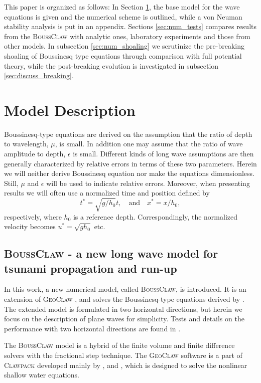 \documentclass[review]{elsarticle}
\newcommand{\BoussClaw}{\textsc{BoussClaw} }
\newcommand{\BoussClawt}{\textsc{BoussClaw}}
\begin{document}
This paper is organized as follows: In Section \ref{sec:model}, the base model
for the wave equations is given and the numerical scheme is outlined,
while a von Neuman stability analysis is put in an appendix. 
Sections \ref{sec:num_tests} compares results from the \BoussClaw with analytic ones, laboratory experiments and those from other models. 
In subsection \ref{sec:num_shoaling} we scrutinize the pre-breaking shoaling of Boussinesq type equations through comparison with full potential theory, while the post-breaking evolution is investigated in  subsection  \ref{sec:discuss_breaking}.

\section{Model Description}
\label{sec:model}

Boussinesq-type equations are   derived 
on the assumption that the ratio of depth to wavelength, $\mu$,
is small. In addition one may assume that 
the ratio of wave amplitude to depth, $\epsilon$ is small.
Different kinds of long wave assumptions are then generally characterized
by relative errors in terms of these two parameters.
Herein we will neither derive Boussinesq equation nor make the equations 
dimensionless. Still, $\mu$ and $\epsilon$ will be used to indicate relative errors.
Moreover, when presenting results we will often use a normalized time and position defined by 
\begin{equation}
\label{eq:norm_coord}
t^*=\sqrt{g/h_0}t,\quad \mathrm{and}\quad x^*=x/h_0,
\end{equation}
 respectively, where $h_0$ is a reference depth. Correspondingly, the 
normalized velocity becomes $u^*=\sqrt{gh_0}$ etc.

\subsection{\BoussClaw - a new long wave model for tsunami propagation and run-up}
In this work, a new numerical model, 
called \BoussClawt, is introduced. 
It is an extension of \textsc{GeoClaw} \citep{clawpack},
and solves 
the Boussinesq-type equations derived by \citet{schaffer1995further}.
The extended model is formulated in two horizontal directions, 
but herein we focus on the description of plane waves for simplicity. 
Tests and details on the 
performance with two horizontal directions are found in \cite{kim2014finite}.

The \BoussClaw model
is a hybrid of the finite volume and finite difference solvers
with the fractional step technique.
The \textsc{GeoClaw} software is 
a part of \textsc{Clawpack} \citep{clawpack}
developed mainly by
\citet{leveque1997wave}, \citet{george2008augmented}
and \citet{BergerGeorgeLeVequeMandli11},
which is designed to solve the nonlinear shallow water equations.
\end{document}
